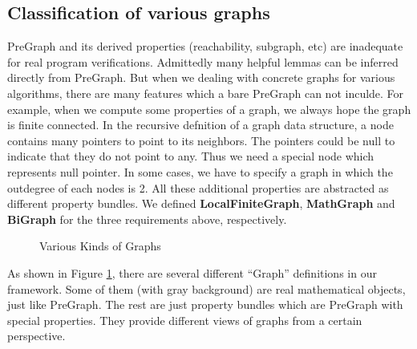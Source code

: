 \subsection{Classification of various graphs}

PreGraph and its derived properties (reachability, subgraph, etc) are
inadequate for real program verifications. Admittedly many helpful
lemmas can be inferred directly from PreGraph. But when we dealing
with concrete graphs for various algorithms, there are many features
which a bare PreGraph can not inculde. For example, when we compute
some properties of a graph, we always hope the graph is finite
connected. In the recursive defnition of a graph data structure, a
node contains many pointers to point to its neighbors. The pointers
could be null to indicate that they do not point to any. Thus we need
a special node which represents null pointer. In some cases, we have
to specify a graph in which the outdegree of each nodes is 2. All
these additional properties are abstracted as different property
bundles. We defined \textbf{LocalFiniteGraph}, \textbf{MathGraph}
and \textbf{BiGraph} for the three requirements above,
respectively.

\begin{figure}[htbp]
\centering
{}
\endpgfgraphicnamed
\vspace{1ex}
\caption{Various Kinds of Graphs}\label{fig:graphs}
\end{figure}

As shown in Figure \ref{fig:graphs}, there are several different
``Graph'' definitions in our framework. Some of them (with gray
background) are real mathematical objects, just like PreGraph. The
rest are just property bundles which are PreGraph with special
properties. They provide different views of graphs from a certain
perspective.

